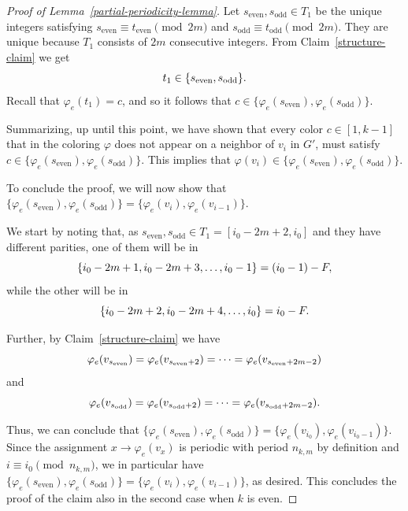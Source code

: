 \documentclass[a4paper,10pt,hidelinks]{amsart}
\renewcommand{\phi}{\ensuremath{\varphi}}
\newenvironment{claimproof}[1][\proofname]{\proof[#1]\renewcommand{\qedsymbol}{$\blacksquare$}}{\endproof}
\theoremstyle{definition}
\begin{document}
\begin{proof}[Proof of Lemma~\ref{partial-periodicity-lemma}]
\begin{claimproof}
        Let $s_{\text{even}}, s_{\text{odd}} \in T_1$ be the unique integers satisfying $s_{\text{even}} \equiv t_{\text{even}} \pmod{2m}$ and $s_{\text{odd}} \equiv t_{\text{odd}} \pmod{2m}$. They are unique because $T_1$ consists of $2m$ consecutive integers. From Claim~\ref{structure-claim} we get 
        \begin{equation}\notag
            t_1 \in \{s_{\text{even}}, s_{\text{odd}}\}.
        \end{equation}
        Recall that $\phi_e(t_1)=c$, and so it follows that $c\in \{\phi_e(s_{\text{even}}),\phi_e(s_{\text{odd}})\}$. 
        
        Summarizing, up until this point, we have shown that every color $c\in [1,k-1]$ that in the coloring $\phi$ does not appear on a neighbor of $v_i$ in $G'$, must satisfy $c\in \{\phi_e(s_{\text{even}}),\phi_e(s_{\text{odd}})\}$. This implies that $\phi(v_i)\in \{\phi_e(s_{\text{even}}),\phi_e(s_{\text{odd}})\}$.

        To conclude the proof, we will now show that $\{\varphi_e(s_{\text{even}}), \varphi_e(s_{\text{odd}})\} = \{\varphi_e(v_{i}), \varphi_e(v_{i - 1})\}$. 

        We start by noting that, as $s_{\text{even}}, s_{\text{odd}} \in T_1 = [i_0 - 2m + 2, i_0]$ and they have different parities, one of them will be in 
        \begin{equation}\notag
            \{i_0 - 2m + 1, i_0 - 2m +3, \dots, i_0 - 1\} = (i_0 - 1) - F,
        \end{equation}
        while the other will be in 
        \begin{equation}\notag
            \{i_0 - 2m + 2, i_0 - 2m + 4, \dots, i_0\} = i_0 - F.
        \end{equation}

        Further, by Claim~\ref{structure-claim} we have \begin{equation}\notag
\phi_e(v_{s_{\text{even}}})=\phi_e(v_{s_{\text{even}}+2})=\cdots=\phi_e(v_{s_{\text{even}}+2m-2})\end{equation} and \begin{equation}\notag
\phi_e(v_{s_{\text{odd}}})=\phi_e(v_{s_{\text{odd}}+2})=\cdots=\phi_e(v_{s_{\text{odd}}+2m-2}).\end{equation}
        
        Thus, we can conclude that $\{\varphi_e(s_{\text{even}}), \varphi_e(s_{\text{odd}})\} = \{\varphi_e(v_{i_0}), \varphi_e(v_{i_0 - 1})\}$. Since the assignment $x\rightarrow \phi_e(v_x)$ is periodic with period $n_{k,m}$ by definition and $i\equiv i_0 \pmod{n_{k,m}}$, we in particular have $\{\varphi_e(s_{\text{even}}), \varphi_e(s_{\text{odd}})\}=\{\varphi_e(v_{i}), \varphi_e(v_{i - 1})\}$, as desired. This concludes the proof of the claim also in the second case when $k$ is even.
    \end{claimproof}


\end{proof}
\end{document}
